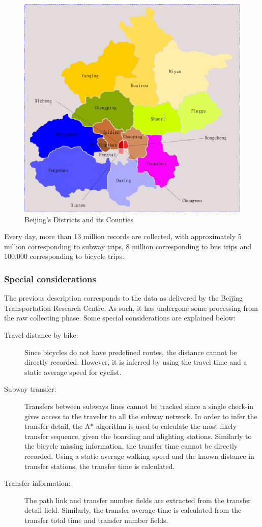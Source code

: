\documentclass{article}
\begin{document}
\begin{figure}
  \centering
  \includegraphics[width=.8\linewidth]{./images/beijing_18areas.png}
  \caption{Beijing's Districts and its Counties}
  \label{fig:data/18areas}
\end{figure}

Every day, more than 13 million records are collected, with approximately 5 million corresponding to subway trips, 8 million corresponding to bus trips and 100,000 corresponding to bicycle trips.

\subsubsection{Special considerations}
The previous description corresponds to the data as delivered by the Beijing Transportation Research Centre. As such, it has undergone some processing from the raw collecting phase. Some special considerations are explained below:


\begin{description}%
\item[Travel distance by bike:] Since bicycles do not have predefined routes, the distance cannot be directly recorded. However, it is inferred by using the travel time and a static average speed for cyclist. 

\item[Subway transfer:] Transfers between subways lines cannot be tracked since a single check-in gives access to the traveler to all the subway network. In order to infer the transfer detail, the A* algorithm is used to calculate the most likely transfer sequence, given the boarding and alighting stations. 
Similarly to the bicycle missing information, the transfer time cannot be directly recorded. Using a static average walking speed and the known distance in transfer stations, the transfer time is calculated. 

\item[Transfer information:] The path link and transfer number fields are extracted from the transfer detail field. Similarly, the transfer average time is calculated from the transfer total time and transfer number fields. 
\end{description}
\end{document}
